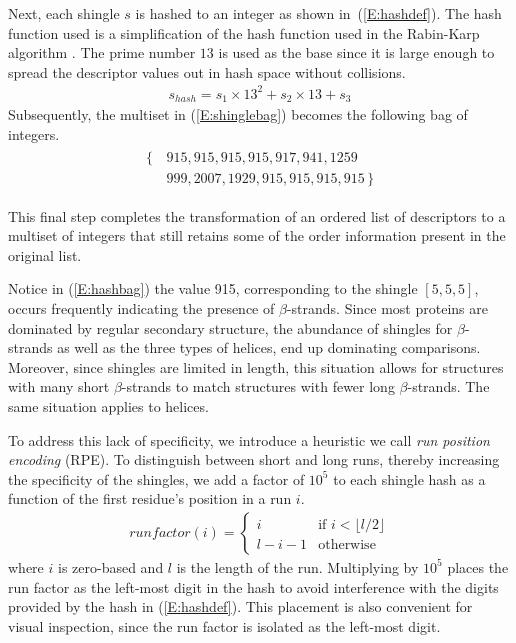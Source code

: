 \documentclass[a4,center,fleqn]{NAR}
\begin{document}
Next, each shingle $s$ is hashed to an integer as shown in~(\ref{E:hashdef}). 
The hash function used is a simplification of the hash function used in the Rabin-Karp algorithm \cite{Karp1987}.
The prime number $13$ is used as the base since it is large enough to spread the descriptor values out in hash space without collisions. 
\begin{gather}\label{E:hashdef}
    s_{hash} = s_1 \times 13^2 + s_2 \times 13 + s_3
\end{gather}
Subsequently, the multiset in (\ref{E:shinglebag}) becomes the following bag of integers.
\begin{align}\label{E:hashbag}
    \begin{split}
    \{\,&915, 915, 915, 915, 917, 941, 1259 \\
        &999, 2007, 1929, 915, 915, 915, 915 \,\}
    \end{split}
\end{align}

This final step completes the transformation of an ordered list of descriptors to a multiset of integers that still retains some of the order information present in the original list. 

Notice in (\ref{E:hashbag}) the value 915, corresponding to the shingle $[ 5, 5, 5 ]$, occurs frequently indicating the presence of $\beta$-strands. 
Since most proteins are dominated by regular secondary structure, the abundance of shingles for $\beta$-strands as well as the three types of helices, end up dominating comparisons. 
Moreover, since shingles are limited in length, this situation allows for structures with many short $\beta$-strands to match structures with fewer long $\beta$-strands.
The same situation applies to helices. 

To address this lack of specificity, we introduce a heuristic we call \emph{run position encoding} (RPE). 
To distinguish between short and long runs, thereby increasing the specificity of the shingles, we add a factor of $10^5$ to each shingle hash as a function of the first residue's position in a run $i$. 
\begin{gather}
    runfactor(i) = 
    \begin{cases}
        i               &\text{if $i < \lfloor l/2 \rfloor$}\\
        l - i - 1       &\text{otherwise} 
    \end{cases}
\end{gather}
where $i$ is zero-based and $l$ is the length of the run. 
Multiplying by $10^5$ places the run factor as the left-most digit in the hash to avoid interference with the digits provided by the hash in (\ref{E:hashdef}).
This placement is also convenient for visual inspection, since the run factor is isolated as the left-most digit. 
\end{document}
